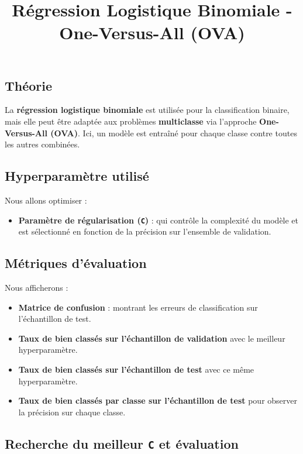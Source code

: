 \documentclass[
  letterpaper,
  DIV=11,
  numbers=noendperiod]{scrartcl}
\title{Régression Logistique Binomiale - One-Versus-All (OVA)}
\author{}
\date{}
\providecommand{\tightlist}{%
  \setlength{\itemsep}{0pt}\setlength{\parskip}{0pt}}\usepackage{longtable,booktabs,array}
\begin{document}
\maketitle


\subsection{Théorie}\label{thuxe9orie}

La \textbf{régression logistique binomiale} est utilisée pour la
classification binaire, mais elle peut être adaptée aux problèmes
\textbf{multiclasse} via l'approche \textbf{One-Versus-All (OVA)}. Ici,
un modèle est entraîné pour chaque classe contre toutes les autres
combinées.

\subsection{Hyperparamètre utilisé}\label{hyperparamuxe8tre-utilisuxe9}

Nous allons optimiser :

\begin{itemize}
\tightlist
\item
  \textbf{Paramètre de régularisation (\texttt{C})} : qui contrôle la
  complexité du modèle et est sélectionné en fonction de la précision
  sur l'ensemble de validation.
\end{itemize}

\subsection{Métriques d'évaluation}\label{muxe9triques-duxe9valuation}

Nous afficherons :

\begin{itemize}
\item
  \textbf{Matrice de confusion} : montrant les erreurs de classification
  sur l'échantillon de test.
\item
  \textbf{Taux de bien classés sur l'échantillon de validation} avec le
  meilleur hyperparamètre.
\item
  \textbf{Taux de bien classés sur l'échantillon de test} avec ce même
  hyperparamètre.
\item
  \textbf{Taux de bien classés par classe sur l'échantillon de test}
  pour observer la précision sur chaque classe.
\end{itemize}

\subsection{\texorpdfstring{Recherche du meilleur \texttt{C} et
évaluation}{Recherche du meilleur C et évaluation}}\label{recherche-du-meilleur-c-et-uxe9valuation}
\end{document}
